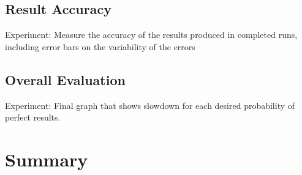 \documentclass{sig-alternate}
\begin{document}
\subsection{Result Accuracy}
\label{sec:eval:acc}

Experiment: Measure the accuracy of the results produced in completed runs, including error bars on the variability of the errors

\subsection{Overall Evaluation}
\label{sec:eval:overall}

Experiment: Final graph that shows slowdown for each desired probability of perfect results.

\section{Summary}
\label{sec:summary}



\end{document}
